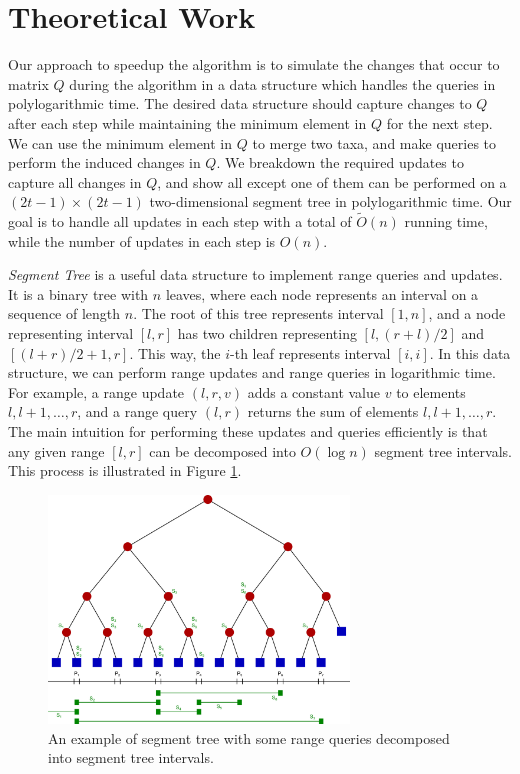 \section{Theoretical Work}

Our approach to speedup the algorithm is to simulate the changes that occur to matrix $Q$ during the algorithm in a data structure which handles the queries in polylogarithmic time. The desired data structure should capture changes to $Q$ after each step while maintaining the minimum element in $Q$ for the next step. We can use the minimum element in $Q$ to merge two taxa, and make queries to perform the induced changes in $Q$. We breakdown the required updates to capture all changes in $Q$, and show all except one of them can be performed on a $(2t-1) \times (2t-1)$ two-dimensional segment tree in polylogarithmic time. Our goal is to handle all updates in each step with a total of $\widetilde{O}(n)$ running time, while the number of updates in each step is $O(n)$.

\emph{Segment Tree} is a useful data structure to implement range queries and updates. It is a binary tree with $n$ leaves, where each node represents an interval on a sequence of length $n$. The root of this tree represents interval $[1, n]$, and a node representing interval $[l, r]$ has two children representing $[l, (r + l) / 2]$ and $[(l + r) / 2 + 1, r]$. This way, the $i$-th leaf represents interval $[i, i]$. In this data structure, we can perform range updates and range queries in logarithmic time. For example, a range update $(l, r, v)$ adds a constant value $v$ to elements $l, l+1, \ldots, r$, and a range query $(l, r)$ returns the sum of elements $l, l+1, \ldots, r$. The main intuition for performing these updates and queries efficiently is that any given range $[l, r]$ can be decomposed into $O(\log{n})$ segment tree intervals. This process is illustrated in Figure \ref{segment-tree}.

\begin{figure}[h!]\label{segment-tree}
	\caption{An example of segment tree with some range queries decomposed into segment tree intervals.}
	\begin{center}
		\includegraphics[width=8cm]{Segment_tree.png}
	\end{center}
\end{figure}

